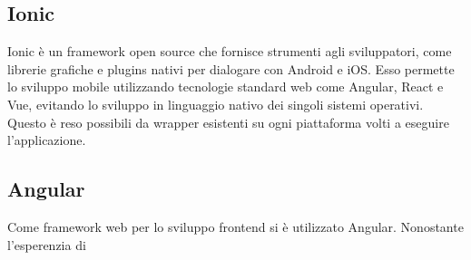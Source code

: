 \subsection{Ionic}

\gls{Ionic} è un \gls{framework} open source che fornisce strumenti agli sviluppatori, come librerie grafiche e plugins nativi per dialogare con \gls{Android} e \gls{iOS}. Esso permette lo sviluppo mobile utilizzando tecnologie standard web come Angular, React e Vue, evitando lo sviluppo in linguaggio nativo dei singoli sistemi operativi.
Questo è reso possibili da wrapper esistenti su ogni piattaforma volti a eseguire l'applicazione.

\subsection{Angular}

Come framework web per lo sviluppo \gls{frontend} si è utilizzato Angular. Nonostante l'esperenzia di


